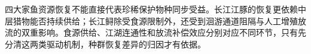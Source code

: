 四大家鱼资源恢复不能直接代表珍稀保护物种同步受益。长江江豚的恢复更依赖中层猎物能否持续供给；长江鲟除受食源限制外，还受到洄游通道阻隔与人工增殖放流的双重影响。食源供给、江湖连通性和放流补偿效应分别对应不同环节，只有先分清这两类驱动机制，种群恢复差异的归因才有依据。
